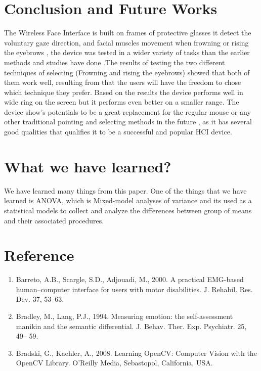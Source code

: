 \documentclass[a4paper]{article}
\begin{document}
\section{Conclusion and Future Works}
The Wireless Face Interface is built on frames of protective glasses it detect the voluntary gaze direction, and facial muscles movement when frowning or 
rising the eyebrows , the device was tested in a wider variety of tasks than the earlier methods and studies have done .The results of testing the two 
different techniques of selecting (Frowning and rising the eyebrows) showed that both of them work well, resulting from that the users will have the 
freedom to chose which technique they prefer. Based on the results the device performs well in wide ring on the screen but it performs even better on a 
smaller range. The device show's potentials to be a great replacement for the regular mouse or any other traditional pointing and selecting methods in the 
future , as it has several good qualities that qualifies it to be a successful and popular HCI device.  


\section{What we have learned?}
We have learned many things from this paper. One of the things that we have learned is ANOVA, which is Mixed-model analyses of variance and its used
as a statistical models to collect and analyze the differences between group of means and their associated procedures. 



\section{Reference}
\begin{enumerate}
\item Barreto, A.B., Scargle, S.D., Adjouadi, M., 2000. A practical EMG-based human–computer interface for users with motor disabilities. J. Rehabil. Res. 
Dev. 37, 53–63.
\item Bradley, M., Lang, P.J., 1994. Measuring emotion: the self-assessment manikin and the semantic differential. J. Behav. Ther. Exp. Psychiatr. 25, 49–
59.
\item Bradski, G., Kaehler, A., 2008. Learning OpenCV: Computer Vision with the OpenCV Library. O’Reilly Media, Sebastopol, California, USA.

\end{enumerate}
\end{document}
